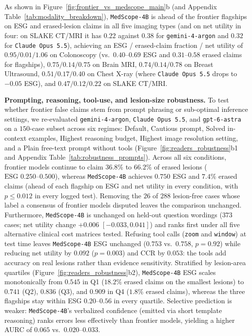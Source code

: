 \documentclass[5p,times,twocolumn,authoryear]{elsarticle}
\begin{document}
As shown in Figure~\ref{fig:frontier_vs_medscope_main}b (and Appendix Table~\ref{tab:modality_breakdown}), \texttt{MedScope-4B} is ahead of the frontier flagships on ESG and erased-lesion claims in all five imaging types (and on net utility in four: on SLAKE CT/MRI it has $0.22$ against $0.38$ for \texttt{gemini-4-argon} and $0.32$ for \texttt{Claude Opus 5.5}), achieving an ESG / erased-claim fraction / net utility of $0.95 / 0.01 / 1.06$ on Colonoscopy (vs.\ $0.40\text{--}0.69$ ESG and $0.31\text{--}0.58$ erased claims for flagships), $0.75 / 0.14 / 0.75$ on Brain MRI, $0.74 / 0.14 / 0.78$ on Breast Ultrasound, $0.51 / 0.17 / 0.40$ on Chest X-ray (where \texttt{Claude Opus 5.5} drops to $-0.05$ ESG), and $0.47 / 0.12 / 0.22$ on SLAKE CT/MRI.

\textbf{Prompting, reasoning, tool-use, and lesion-size robustness.} To test whether frontier false claims stem from prompt phrasing or sub-optimal inference settings, we re-evaluated \texttt{gemini-4-argon}, \texttt{Claude Opus 5.5}, and \texttt{gpt-6-astra} on a $150$-case subset across six regimes: Default, Cautious prompt, Solved in-context examples, Highest reasoning budget, Highest image resolution setting, and a Plain free-text prompt without tools (Figure~\ref{fig:readers_robustness}b1 and Appendix Table~\ref{tab:robustness_prompts}). Across all six conditions, frontier models continue to claim $36.8\%$ to $66.2\%$ of erased lesions ($\text{ESG } 0.250\text{--}0.500$), whereas \texttt{MedScope-4B} achieves $0.750$ ESG and $7.4\%$ erased claims (ahead of each flagship on ESG and net utility in every condition, with $p \le 0.012$ in every logged test). Removing the $26$ of $288$ lesion-free cases whose label a consensus of frontier models disputed leaves the comparison unchanged. Furthermore, \texttt{MedScope-4B} is unchanged on held-out question wordings ($373$ cases; net utility change $+0.006$ $[-0.033, 0.041]$) and ranks first under all five alternative clinical cost matrices tested. Refusing tool calls (\texttt{zoom} and \texttt{window}) at test time leaves \texttt{MedScope-4B} ESG unchanged ($0.753$ vs.\ $0.758$, $p = 0.92$) while reducing net utility by $0.092$ ($p = 0.003$) and CCR by $0.053$: the tools add accuracy on real lesions rather than evidence sensitivity. Stratified by lesion-area quartiles (Figure~\ref{fig:readers_robustness}b2), \texttt{MedScope-4B} ESG scales monotonically from $0.545$ in Q1 ($18.2\%$ erased claims on the smallest lesions) to $0.741$ (Q2), $0.836$ (Q3), and $0.909$ in Q4 ($1.8\%$ erased claims), whereas the three flagships stay within ESG $0.20\text{--}0.56$ in every quartile. Selective prediction is weaker: \texttt{MedScope-4B}'s verbalized confidence (emitted via short template reasoning) ranks errors less effectively than frontier models, yielding a higher AURC of $0.065$ vs.\ $0.020\text{--}0.033$.
\end{document}
